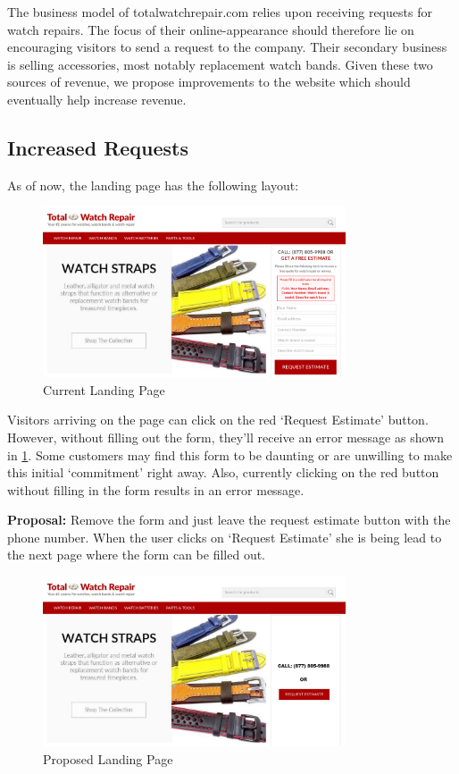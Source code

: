 \documentclass[12pt, authoryear]{elsarticle}
\begin{document}
The business model of totalwatchrepair.com relies upon receiving requests for watch repairs. The focus of their online-appearance should therefore lie on encouraging visitors to send a request to the company. Their secondary business is selling accessories, most notably replacement watch bands. Given these two sources of revenue, we propose improvements to the website which should eventually help increase revenue.

\subsection{Increased Requests}
As of now, the landing page has the following layout:

\begin{figure}[!htp]
	\centering
	\includegraphics[clip, angle=0,width=0.8\textwidth]{LandingPage.png}
	\caption{ Current Landing Page}\label{LandingPage}
\end{figure}

Visitors arriving on the page can click on the red ‘Request Estimate’ button. However, without filling out the form, they’ll receive an error message as shown in \ref{LandingPage}. Some customers may find this form to be daunting or are unwilling to make this initial ‘commitment’ right away.  Also, currently clicking on the red button without filling in the form results in an error message.

\textbf{Proposal:} Remove the form and just leave the request estimate button with the phone number. When the user clicks on ‘Request Estimate’ she is being lead to the next page where the form can be filled out. 

\begin{figure}[H]
	\centering
	\includegraphics[clip, angle=0, width=0.8\textwidth]{New_Landing_Page.jpg}
	\caption{Proposed Landing Page}\label{NewLandingPage_Shop}
\end{figure}
\end{document}

